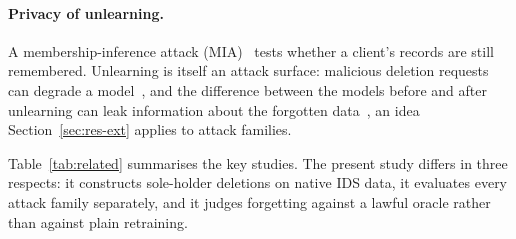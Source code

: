 \documentclass[pdflatex,sn-mathphys-num,iicol]{sn-jnl}
\begin{document}
\paragraph{Privacy of unlearning.} A membership-inference attack (MIA)~\cite{shokri2017,yeom2018} tests whether a client's records are still remembered. Unlearning is itself an attack surface: malicious deletion requests can degrade a model~\cite{chen2025fedmua}, and the difference between the models before and after unlearning can leak information about the forgotten data~\cite{zhou2026fuia}, an idea Section~\ref{sec:res-ext} applies to attack families.

Table~\ref{tab:related} summarises the key studies. The present study differs in three respects: it constructs sole-holder deletions on native IDS data, it evaluates every attack family separately, and it judges forgetting against a lawful oracle rather than against plain retraining.
\end{document}
